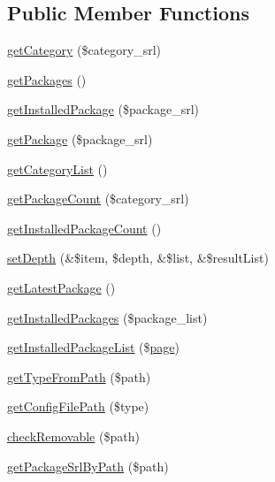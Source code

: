 \subsection*{Public Member Functions}
\begin{DoxyCompactItemize}
\item 
\hyperlink{classautoinstallModel_a8f87ae860d59c5230baded7e25f38b96}{get\-Category} (\$category\-\_\-srl)
\item 
\hyperlink{classautoinstallModel_a32b3e83419ad1f9a01fc95ce8f8db795}{get\-Packages} ()
\item 
\hyperlink{classautoinstallModel_a80912c7d12ec4d37f75d0e1475adab4e}{get\-Installed\-Package} (\$package\-\_\-srl)
\item 
\hyperlink{classautoinstallModel_aaa22f977e7ba5720afda446a6e508c51}{get\-Package} (\$package\-\_\-srl)
\item 
\hyperlink{classautoinstallModel_a64deb99bf9367124115928a6faa12933}{get\-Category\-List} ()
\item 
\hyperlink{classautoinstallModel_a88e07f232668549a2b68478ad42f4005}{get\-Package\-Count} (\$category\-\_\-srl)
\item 
\hyperlink{classautoinstallModel_a1b9cec687d137129acec8db89f8a822b}{get\-Installed\-Package\-Count} ()
\item 
\hyperlink{classautoinstallModel_a9a626cc36cb67b076a07debe5f6c983c}{set\-Depth} (\&\$item, \$depth, \&\$list, \&\$result\-List)
\item 
\hyperlink{classautoinstallModel_a237e95933e438cec978e9382dfee6199}{get\-Latest\-Package} ()
\item 
\hyperlink{classautoinstallModel_a91d9fe9fc6776b5338fca658b5b1a6d8}{get\-Installed\-Packages} (\$package\-\_\-list)
\item 
\hyperlink{classautoinstallModel_a2f132c9c41e1689b3e28df6097dae238}{get\-Installed\-Package\-List} (\$\hyperlink{classpage}{page})
\item 
\hyperlink{classautoinstallModel_a29f5fd06b39d6df431d699efcb0aba47}{get\-Type\-From\-Path} (\$path)
\item 
\hyperlink{classautoinstallModel_afc9baa56522814866589ebe952041a43}{get\-Config\-File\-Path} (\$type)
\item 
\hyperlink{classautoinstallModel_ab4637f5520f16fffe622f5abd73253b0}{check\-Removable} (\$path)
\item 
\hyperlink{classautoinstallModel_a7344733b35feec3a7bcc8a1440d2e682}{get\-Package\-Srl\-By\-Path} (\$path)
\item 

\end{DoxyCompactItemize}

